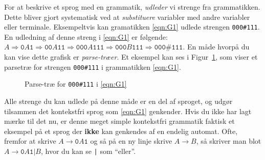 For at beskrive et sprog med en grammatik, \textit{udleder} vi strenge fra grammatikken. Dette bliver gjort systematisk ved at \textit{substituere} variabler med andre variabler eller terminale. Eksempeltvis kan gramatikken \ref{eqn:G1} udlede strengen \texttt{000\#111}. En udledning af denne streng i \ref{eqn:G1} er følgende: $A \Rightarrow \mathtt{0}A \mathtt{1} \Rightarrow \mathtt{00}A \mathtt{11} \Rightarrow \mathtt{000}A \mathtt{111} \Rightarrow \mathtt{000}B \mathtt{111} \Rightarrow \mathtt{000\#111}$. En måde hvorpå du kan vise dette grafisk er \textit{parse-træer}. Et eksempel kan ses i Figur~\ref{fig:parsetreeg1}, som viser et parsetræ for strengen \texttt{000\#111} i grammatikken \ref{eqn:G1}.
\begin{figure}[ht]
  \centering
{}
  \caption{\label{fig:parsetreeg1} Parse-træ for \texttt{000\#111} i \ref{eqn:G1}}
\end{figure}


Alle strenge du kan udlede på denne måde er en del af sproget, og udgør tilsammen det kontekstfri sprog som \ref{eqn:G1} genkender. Hvis du ikke har lagt mærke til det nu, er denne meget simple kontekstfri grammatik faktisk et eksempel på et sprog der \textbf{ikke} kan genkendes af en endelig automat. Ofte, fremfor at skrive $A \rightarrow \mathtt{0}A \mathtt{1}$ og så på en ny linje skrive $A \rightarrow B$, så skriver man blot $A \rightarrow \mathtt{0} A \mathtt{1} | B$, hvor du kan se \texttt{|} som ``eller''.

